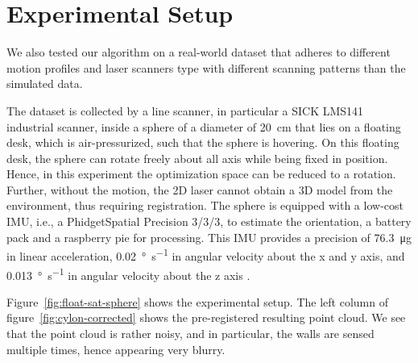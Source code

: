 \section{Experimental Setup}\label{sec:experimentalSetup}

We also tested our algorithm on a real-world dataset that adheres to different motion profiles and laser scanners type with different scanning patterns than the simulated data.  

The dataset is collected by a line scanner, in particular a SICK LMS141 industrial scanner, inside a sphere of a diameter of \SI{20}{\centi\meter} that lies on a floating desk, which is air-pressurized, such that the sphere is hovering.
On this floating desk, the sphere can rotate freely about all axis while being fixed in position. 
Hence, in this experiment the optimization space can be reduced to a rotation.
Further, without the motion, the 2D laser cannot obtain a 3D model from the environment, thus requiring registration. 
The sphere is equipped with a low-cost IMU, i.e., a PhidgetSpatial Precision 3/3/3, to estimate the orientation, a battery pack and a raspberry pie for processing.
This IMU provides a precision of \SI{76.3}{\micro g} in linear acceleration, \SI{0.02}{\degree\per\second} in angular velocity about the x and y axis, and \SI{0.013}{\degree\per\second} in angular velocity about the z axis \cite{PhidgetSpatial}.  

Figure~\ref{fig:float-sat-sphere} shows the experimental setup. The left column of figure~\ref{fig:cylon-corrected} shows the pre-registered resulting point cloud. 
We see that the point cloud is rather noisy, and in particular, the walls are sensed multiple times, hence appearing very blurry. 

